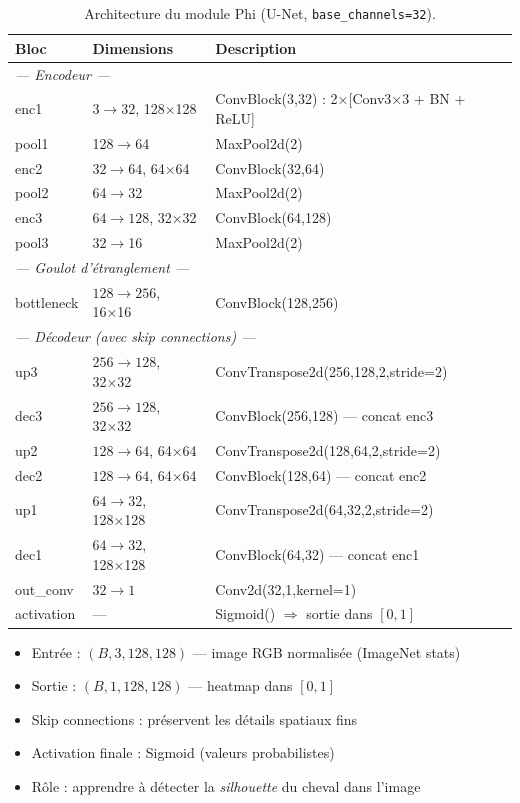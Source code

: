 \documentclass[12pt,a4paper]{article}
\begin{document}
\begin{table}[H]
  \centering
  \caption{Architecture du module Phi (U-Net, \texttt{base\_channels=32}).}
  \begin{tabularx}{\textwidth}{llX}
  \toprule
  \textbf{Bloc} & \textbf{Dimensions} & \textbf{Description} \\
  \midrule
  \multicolumn{3}{l}{\textit{--- Encodeur ---}} \\
  enc1 & $3 \to 32$, 128×128 & ConvBlock(3,32) : 2×[Conv3×3 + BN + ReLU] \\
  pool1 & 128$\to$64 & MaxPool2d(2) \\
  enc2 & $32 \to 64$, 64×64 & ConvBlock(32,64) \\
  pool2 & 64$\to$32 & MaxPool2d(2) \\
  enc3 & $64 \to 128$, 32×32 & ConvBlock(64,128) \\
  pool3 & 32$\to$16 & MaxPool2d(2) \\
  \midrule
  \multicolumn{3}{l}{\textit{--- Goulot d'étranglement ---}} \\
  bottleneck & $128 \to 256$, 16×16 & ConvBlock(128,256) \\
  \midrule
  \multicolumn{3}{l}{\textit{--- Décodeur (avec skip connections) ---}} \\
  up3 & $256 \to 128$, 32×32 & ConvTranspose2d(256,128,2,stride=2) \\
  dec3 & $256 \to 128$, 32×32 & ConvBlock(256,128) — concat enc3 \\
  up2 & $128 \to 64$, 64×64 & ConvTranspose2d(128,64,2,stride=2) \\
  dec2 & $128 \to 64$, 64×64 & ConvBlock(128,64) — concat enc2 \\
  up1 & $64 \to 32$, 128×128 & ConvTranspose2d(64,32,2,stride=2) \\
  dec1 & $64 \to 32$, 128×128 & ConvBlock(64,32) — concat enc1 \\
  \midrule
  out\_conv & $32 \to 1$ & Conv2d(32,1,kernel=1) \\
  activation & --- & Sigmoid() $\Rightarrow$ sortie dans $[0,1]$ \\
  \bottomrule
  \end{tabularx}
\end{table}

\begin{infobox}
  \begin{itemize}
    \item Entrée : $(B, 3, 128, 128)$ --- image RGB normalisée (ImageNet stats)
    \item Sortie : $(B, 1, 128, 128)$ --- heatmap dans $[0,1]$
    \item Skip connections : préservent les détails spatiaux fins
    \item Activation finale : Sigmoid (valeurs probabilistes)
    \item Rôle : apprendre à détecter la \emph{silhouette} du cheval dans l'image
  \end{itemize}
\end{infobox}
\end{document}
